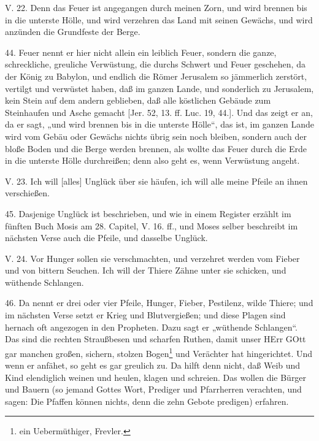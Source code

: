 \begin{schriftzitat}
V. 22. Denn das Feuer ist angegangen durch meinen Zorn, und wird brennen bis in die unterste Hölle, und wird verzehren das Land mit seinen Gewächs, und wird anzünden die Grundfeste der Berge.
\end{schriftzitat}

44. Feuer nennt er hier nicht allein ein leiblich Feuer, sondern die ganze, schreckliche, greuliche Verwüstung, die durchs Schwert und Feuer geschehen, da der König zu Babylon, und endlich
die Römer Jerusalem so jämmerlich zerstört, vertilgt und verwüstet haben, daß im ganzen Lande, und sonderlich zu Jerusalem, kein Stein auf dem andern geblieben, daß alle köstlichen Gebäude zum Steinhaufen und Asche gemacht [Jer. 52, 13. ff. Luc. 19, 44.]. Und das zeigt er an, da er sagt, „und wird brennen bis in die unterste Hölle“, das ist, im ganzen Lande wird vom Gebäu oder Gewächs nichts übrig sein noch bleiben, sondern auch der bloße Boden und die Berge werden brennen, als wollte das Feuer durch die Erde in die unterste Hölle durchreißen; denn also geht es, wenn Verwüstung angeht.

\begin{schriftzitat}
V. 23. Ich will [alles] Unglück über sie häufen, ich will alle meine Pfeile an ihnen verschießen.
\end{schriftzitat}

45. Dasjenige Unglück ist beschrieben, und wie in einem Register erzählt im fünften Buch Mosis am 28. Capitel, V. 16. ff., und Moses selber beschreibt im nächsten Verse auch die Pfeile, und dasselbe Unglück.

\begin{schriftzitat}
V. 24. Vor Hunger sollen sie verschmachten, und verzehret werden vom Fieber und von bittern Seuchen. Ich will der Thiere Zähne unter sie schicken, und wüthende Schlangen.
\end{schriftzitat}

46. Da nennt er drei oder vier Pfeile, Hunger, Fieber, Pestilenz, wilde Thiere; und im nächsten Verse setzt er Krieg und Blutvergießen; und diese Plagen sind hernach oft angezogen in den Propheten. Dazu sagt er „wüthende Schlangen“. Das sind die rechten Straußbesen und scharfen Ruthen, damit unser HErr GOtt gar manchen großen, sichern, stolzen Bogen\footnote{ ein Uebermüthiger, Frevler.} und Verächter hat hingerichtet. Und wenn er anfähet, so geht es gar greulich zu. Da hilft denn nicht, daß Weib und Kind elendiglich weinen und heulen, klagen und schreien. Das wollen die Bürger und Bauern (so jemand Gottes Wort, Prediger und Pfarrherren verachten, und sagen: Die Pfaffen können nichts, denn die zehn Gebote predigen) erfahren.

